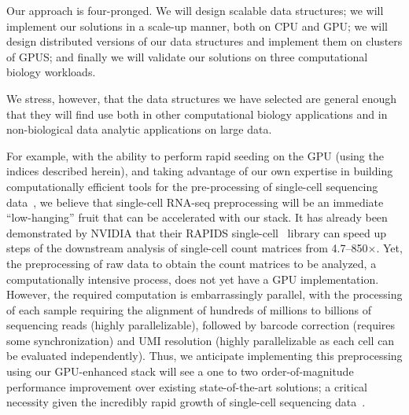 {Our approach is four-pronged.}  We will design scalable data structures; we will 
implement our solutions in a scale-up manner,  both on CPU and GPU\@; we will design distributed versions of our data structures and implement them on clusters of GPUS; and finally we will validate our solutions
on three {computational biology} workloads.  

We stress, however, that the data structures we have selected are general enough that they will find use both in other computational biology applications and in non-biological data analytic applications on large data.  

For example, with the ability to perform rapid seeding on the GPU (using the indices described herein), and taking advantage of our own expertise in building computationally efficient tools for the pre-processing of single-cell sequencing data~\cite{he2022alevin}, we believe that single-cell RNA-seq preprocessing will be an immediate ``low-hanging'' fruit that can be accelerated with our stack. It has already been demonstrated by NVIDIA that their RAPIDS single-cell~\cite{rapids} library can speed up steps of the downstream analysis of single-cell count matrices from 4.7--850$\times$. Yet, the preprocessing of raw data to obtain the count matrices to be analyzed, a computationally intensive process, does not yet have a GPU implementation. However, the required computation is embarrassingly parallel, with the processing of each sample requiring the alignment of hundreds of millions to billions of sequencing reads (highly parallelizable), followed by barcode correction (requires some synchronization) and UMI resolution (highly parallelizable as each cell can be evaluated independently). Thus, we anticipate implementing this preprocessing using our GPU-enhanced stack will see a one to two order-of-magnitude performance improvement over existing state-of-the-art solutions; a critical necessity given the incredibly rapid growth of single-cell sequencing data~\cite{scgrowth2022}.





